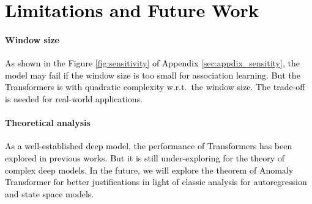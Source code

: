 \documentclass{article} %
\newcommand{\update}[1]{{\textcolor{black}{#1}}}
\begin{document}
\section{\update{Limitations and Future
Work}}\label{sec:limitations}
\paragraph{Window size} \update{As shown in the Figure \ref{fig:sensitivity} of Appendix \ref{sec:appdix_sensitity}, the model may fail if the window size is too small for association learning. But the Transformers is with quadratic complexity w.r.t.~the window size. The trade-off is needed for real-world applications.}

\paragraph{Theoretical analysis} \update{As a well-established deep model, the performance of Transformers has been explored in previous works. But it is still under-exploring for the theory of complex deep models. In the future, we will explore the theorem of Anomaly Transformer for better justifications in light of classic analysis for autoregression and state space models.}
\end{document}

